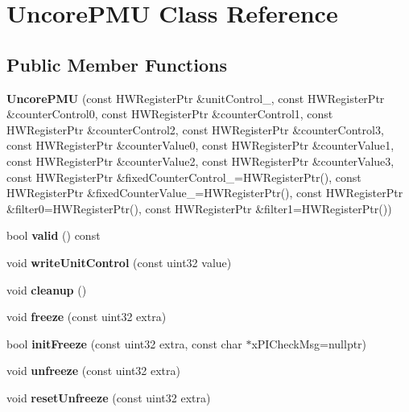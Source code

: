 \section{Uncore\+P\+MU Class Reference}
\label{classUncorePMU}
\subsection*{Public Member Functions}
\begin{DoxyCompactItemize}
\item 
\mbox{\label{classUncorePMU_a1f51f9b222f58ec16e6eacb1541cf0b4}} 
{\bfseries Uncore\+P\+MU} (const H\+W\+Register\+Ptr \&unit\+Control\+\_\+, const H\+W\+Register\+Ptr \&counter\+Control0, const H\+W\+Register\+Ptr \&counter\+Control1, const H\+W\+Register\+Ptr \&counter\+Control2, const H\+W\+Register\+Ptr \&counter\+Control3, const H\+W\+Register\+Ptr \&counter\+Value0, const H\+W\+Register\+Ptr \&counter\+Value1, const H\+W\+Register\+Ptr \&counter\+Value2, const H\+W\+Register\+Ptr \&counter\+Value3, const H\+W\+Register\+Ptr \&fixed\+Counter\+Control\+\_\+=H\+W\+Register\+Ptr(), const H\+W\+Register\+Ptr \&fixed\+Counter\+Value\+\_\+=H\+W\+Register\+Ptr(), const H\+W\+Register\+Ptr \&filter0=H\+W\+Register\+Ptr(), const H\+W\+Register\+Ptr \&filter1=H\+W\+Register\+Ptr())
\item 
\mbox{\label{classUncorePMU_a3ba97d0e2240464ff5b54777b1c70e81}} 
bool {\bfseries valid} () const
\item 
\mbox{\label{classUncorePMU_a62d1c768e2683c91aa0971b27e96c9b3}} 
void {\bfseries write\+Unit\+Control} (const uint32 value)
\item 
\mbox{\label{classUncorePMU_ae869cf78f99095e20ee0b7d62d41e9fb}} 
void {\bfseries cleanup} ()
\item 
\mbox{\label{classUncorePMU_aeb6b2d94bf3b9293c48a2b2f1b16be5f}} 
void {\bfseries freeze} (const uint32 extra)
\item 
\mbox{\label{classUncorePMU_a8fbfb28dd06fffe613ad1aafc6c5ab22}} 
bool {\bfseries init\+Freeze} (const uint32 extra, const char $\ast$x\+P\+I\+Check\+Msg=nullptr)
\item 
\mbox{\label{classUncorePMU_a9adba2c2498e44a3d312b2b4f13fbdd8}} 
void {\bfseries unfreeze} (const uint32 extra)
\item 
\mbox{\label{classUncorePMU_a5ca4eebb1d1f1da1f3c5c84f55b0f125}} 
void {\bfseries reset\+Unfreeze} (const uint32 extra)
\end{DoxyCompactItemize}
